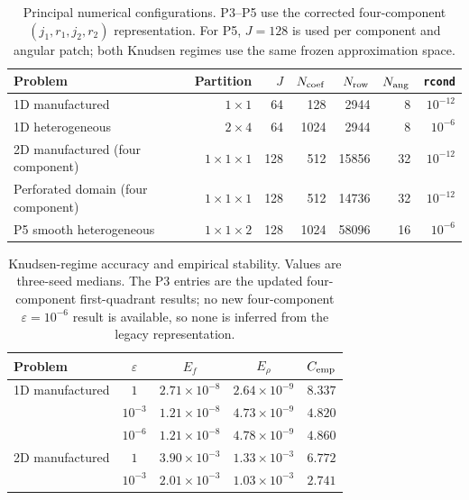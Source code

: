 \begin{table}[t]
\centering
\caption{Principal numerical configurations. P3--P5 use the corrected four-component $(j_1,r_1,j_2,r_2)$ representation. For P5, $J=128$ is used per component and angular patch; both Knudsen regimes use the same frozen approximation space.}
\label{tab:configurations}
\begin{tabular}{lrrrrrr}
\toprule
Problem & Partition & $J$ & $N_{\rm coef}$ & $N_{\rm row}$ & $N_{\rm ang}$ & \texttt{rcond}\\
\midrule
1D manufactured & $1\times1$ & 64 & 128 & 2944 & 8 & $10^{-12}$\\
1D heterogeneous & $2\times4$ & 64 & 1024 & 2944 & 8 & $10^{-6}$\\
2D manufactured (four component) & $1\times1\times1$ & 128 & 512 & 15856 & 32 & $10^{-12}$\\
Perforated domain (four component) & $1\times1\times1$ & 128 & 512 & 14736 & 32 & $10^{-12}$\\
P5 smooth heterogeneous & $1\times1\times2$ & 128 & 1024 & 58096 & 16 & $10^{-6}$\\
\bottomrule
\end{tabular}
\end{table}

\begin{table}[t]
\centering
\caption{Knudsen-regime accuracy and empirical stability. Values are three-seed medians. The P3 entries are the updated four-component first-quadrant results; no new four-component $\varepsilon=10^{-6}$ result is available, so none is inferred from the legacy representation.}
\label{tab:knudsen-accuracy}
\begin{tabular}{lcccc}
\toprule
Problem & $\varepsilon$ & $E_f$ & $E_\rho$ & $C_{\rm emp}$\\
\midrule
1D manufactured & $1$ & $2.71\times10^{-8}$ & $2.64\times10^{-9}$ & $8.337$\\
 & $10^{-3}$ & $1.21\times10^{-8}$ & $4.73\times10^{-9}$ & $4.820$\\
 & $10^{-6}$ & $1.21\times10^{-8}$ & $4.78\times10^{-9}$ & $4.860$\\
\midrule
2D manufactured & $1$ & $3.90\times10^{-3}$ & $1.33\times10^{-3}$ & $6.772$\\
 & $10^{-3}$ & $2.01\times10^{-3}$ & $1.03\times10^{-3}$ & $2.741$\\
\bottomrule
\end{tabular}
\end{table}

